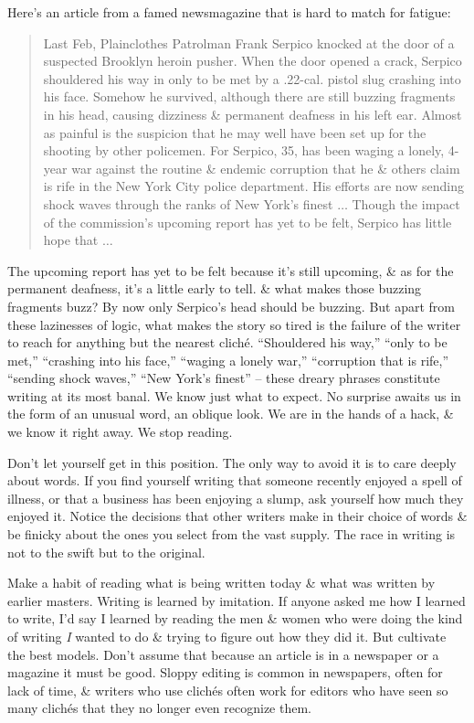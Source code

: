 \documentclass{article}
\begin{document}
Here's an article from a famed newsmagazine that is hard to match for fatigue:
\begin{quotation}
	Last Feb, Plainclothes Patrolman Frank Serpico knocked at the door of a suspected Brooklyn heroin pusher. When the door opened a crack, Serpico shouldered his way in only to be met by a .22-cal. pistol slug crashing into his face. Somehow he survived, although there are still buzzing fragments in his head, causing dizziness \& permanent deafness in his left ear. Almost as painful is the suspicion that he may well have been set up for the shooting by other policemen. For Serpico, 35, has been waging a lonely, 4-year war against the routine \& endemic corruption that he \& others claim is rife in the New York City police department. His efforts are now sending shock waves through the ranks of New York's finest $\ldots$ Though the impact of the commission's upcoming report has yet to be felt, Serpico has little hope that $\ldots$
\end{quotation}
The upcoming report has yet to be felt because it's still upcoming, \& as for the permanent deafness, it's a little early to tell. \& what makes those buzzing fragments buzz? By now only Serpico's head should be buzzing. But apart from these lazinesses of logic, what makes the story so tired is the failure of the writer to reach for anything but the nearest clich\'e. ``Shouldered his way,'' ``only to be met,'' ``crashing into his face,'' ``waging a lonely war,'' ``corruption that is rife,'' ``sending shock waves,'' ``New York's finest'' -- these dreary phrases constitute writing at its most banal. We know just what to expect. No surprise awaits us in the form of an unusual word, an oblique look. We are in the hands of a hack, \& we know it right away. We stop reading.

Don't let yourself get in this position. The only way to avoid it is to care deeply about words. If you find yourself writing that someone recently enjoyed a spell of illness, or that a business has been enjoying a slump, ask yourself how much they enjoyed it. Notice the decisions that other writers make in their choice of words \& be finicky about the ones you select from the vast supply. The race in writing is not to the swift but to the original.

Make a habit of reading what is being written today \& what was written by earlier masters. Writing is learned by imitation. If anyone asked me how I learned to write, I'd say I learned by reading the men \& women who were doing the kind of writing \textit{I} wanted to do \& trying to figure out how they did it. But cultivate the best models. Don't assume that because an article is in a newspaper or a magazine it must be good. Sloppy editing is common in newspapers, often for lack of time, \& writers who use clich\'es often work for editors who have seen so many clich\'es that they no longer even recognize them.
\end{document}
